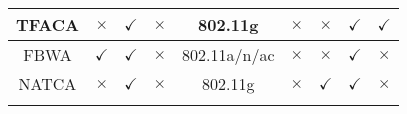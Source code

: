 \begin{table*}
\begin{tabular}{|c|c|c|c|c|c|c|c|c|}
		TFACA \cite{CA-VTC-14}&$\times$&$\checkmark$&$\times$&802.11g&$\times$&$\times$&$\checkmark$&$\checkmark$\\\hline		
		FBWA \cite{CA-BW-VTC-14}&$\checkmark$&$\checkmark$&$\times$&802.11a/n/ac&$\times$&$\times$&$\checkmark$&$\times$\\\hline		
		NATCA \cite{DCA-residential-2015}&$\times$&$\checkmark$&$\times$&802.11g&$\times$&$\checkmark$&$\checkmark$&$\times$ 
		\\\Xhline{3\arrayrulewidth}
	\end{tabular}
\end{table*}